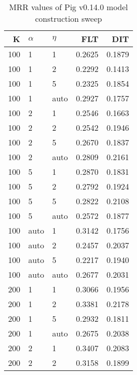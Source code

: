 
\begin{table}
\begin{spacing}{1.2}
\centering
\caption{MRR values of Pig v0.14.0 model construction sweep}
\label{table:pig_model_sweep}
\vspace{0.2em}
\parbox{.45\linewidth}{\centering \begin{tabular}{rll|rr}
\toprule
   K & $\alpha$ &   $\eta$ & FLT &       DIT \\
\midrule
 100 &     1 &     1 &           0.2625 &       0.1879 \\
 100 &     1 &     2 &           0.2292 &       0.1413 \\
 100 &     1 &     5 &           0.2325 &       0.1854 \\
 100 &     1 &  auto &           0.2927 &       0.1757 \\
 100 &     2 &     1 &           0.2546 &       0.1663 \\
 100 &     2 &     2 &           0.2542 &       0.1946 \\
 100 &     2 &     5 &           0.2670 &       0.1837 \\
 100 &     2 &  auto &           0.2809 &       0.2161 \\
 100 &     5 &     1 &           0.2870 &       0.1831 \\
 100 &     5 &     2 &           0.2792 &       0.1924 \\
 100 &     5 &     5 &           0.2822 &       0.2108 \\
 100 &     5 &  auto &           0.2572 &       0.1877 \\
 100 &  auto &     1 &           0.3142 &       0.1756 \\
 100 &  auto &     2 &           0.2457 &       0.2037 \\
 100 &  auto &     5 &           0.2217 &       0.1940 \\
 100 &  auto &  auto &           0.2677 &       0.2031 \\
 200 &     1 &     1 &           0.3066 &       0.1956 \\
 200 &     1 &     2 &           0.3381 &       0.2178 \\
 200 &     1 &     5 &           0.2932 &       0.1811 \\
 200 &     1 &  auto &           0.2675 &       0.2038 \\
 200 &     2 &     1 &           0.3407 &       0.2083 \\
 200 &     2 &     2 &           0.3158 &       0.1899 \\

\end{tabular}}
\end{spacing}
\end{table}
